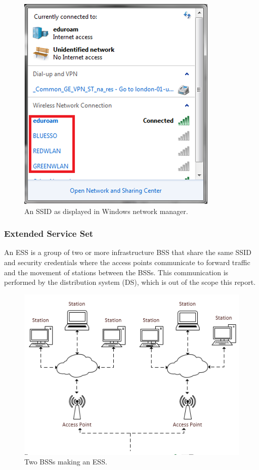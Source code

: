 \begin{figure}[htb!]
\centering\includegraphics{intro/diagrams/ssid.png}
\caption{An SSID as displayed in Windows network manager.}
\end{figure}

\subsubsection*{Extended Service Set}
An ESS is a group of two or more infrastructure BSS that share the same SSID and security credentials where the access points communicate to forward traffic and the movement of stations between the BSSs. This communication is performed by the distribution system (DS), which is out of the scope this report.

\begin{figure}[htb!]
\centering\includegraphics{intro/diagrams/ess.png}
\caption{Two BSSs making an ESS.}
\end{figure}
\newpage

